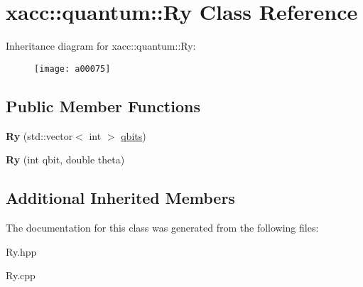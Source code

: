 \hypertarget{a00075}{}\section{xacc\+:\+:quantum\+:\+:Ry Class Reference}
\label{a00075}
Inheritance diagram for xacc\+:\+:quantum\+:\+:Ry\+:\begin{figure}[H]
\begin{center}
\leavevmode
\texttt{[image: a00075]}
\end{center}
\end{figure}
\subsection*{Public Member Functions}
\begin{DoxyCompactItemize}
\item 
{\bfseries Ry} (std\+::vector$<$ int $>$ \hyperlink{a00042_a2a56be6c2519ea65df4d06f4abae1393}{qbits})\hypertarget{a00075_a542e1c0576a8e784f6cece4c77598486}{}\label{a00075_a542e1c0576a8e784f6cece4c77598486}

\item 
{\bfseries Ry} (int qbit, double theta)\hypertarget{a00075_a1cb81fe622168ba8d79fa2a78b5b0006}{}\label{a00075_a1cb81fe622168ba8d79fa2a78b5b0006}

\end{DoxyCompactItemize}
\subsection*{Additional Inherited Members}


The documentation for this class was generated from the following files\+:\begin{DoxyCompactItemize}
\item 
Ry.\+hpp\item 
Ry.\+cpp\end{DoxyCompactItemize}
